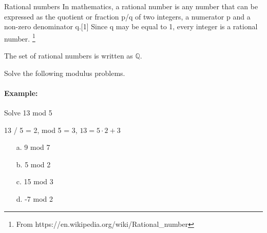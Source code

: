         \begin{intro}{Rational numbers}
            In mathematics, a rational number is any number that can be
            expressed as the quotient or fraction p/q of two integers,
            a numerator p and a non-zero denominator q.[1] Since q may be equal to 1,
            every integer is a rational number.
            \footnote{From https://en.wikipedia.org/wiki/Rational\_number}

            The set of rational numbers is written as $\mathbb{Q}$.
        \end{intro}

        \begin{questionNOGRADE}{\thequestion}
            Solve the following modulus problems.

            \paragraph{Example:} Solve 13 mod 5 \\
                \begin{answer} 13 / 5 = 2,  mod 5 = 3, \tab $13 = 5 \cdot 2 + 3$ \end{answer}

            \begin{enumerate}
                \item[a.] 9 mod 7

                \item[b.] 5 mod 2

                \item[c.] 15 mod 3

                \item[d.] -7 mod 2

            \end{enumerate}
        \end{questionNOGRADE}

        \hrulefill

